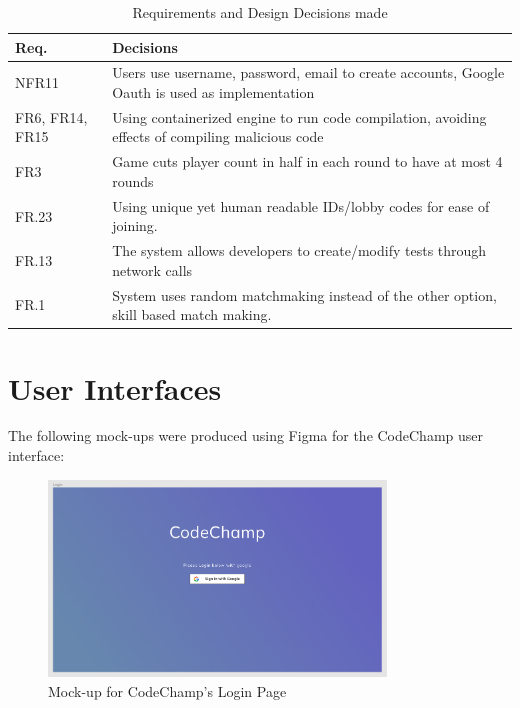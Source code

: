 \documentclass[12pt, titlepage]{article}
\begin{document}
\begin{table}[H]
\centering 
\begin{tabular}{p{} p{}}
\toprule
\textbf{Req.} & \textbf{Decisions}\\
\midrule
NFR11 & Users use username, password, email to create accounts, Google Oauth is used as implementation\\ 
FR6, FR14, FR15 & Using containerized engine to run code compilation, avoiding effects of compiling malicious code\\
FR3 & Game cuts player count in half in each round to have at most 4 rounds\\
FR.23 & Using unique yet human readable IDs/lobby codes for ease of joining. \\
FR.13 & The system allows developers to create/modify tests through network calls \\
FR.1 & System uses random matchmaking instead of the other option, skill based match making. \\
\hline
\end{tabular}
\caption{Requirements and Design Decisions made}
\label{TblRT2}
\end{table}


\section{User Interfaces}

The following mock-ups were produced using Figma for the CodeChamp user interface: 

\begin{figure}[H]
\centering
\includegraphics[width=0.8\textwidth]{Design/SystDesign/LoginPage.png}
\caption{Mock-up for CodeChamp's Login Page}
\end{figure}
\end{document}
